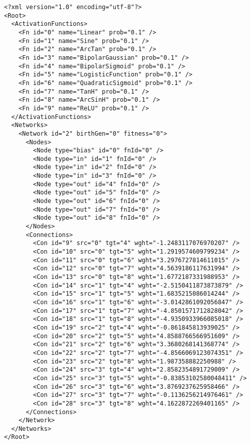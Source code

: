 ﻿\label{sec:appendix}

\begin{lstlisting}[caption={Пример XML файла, представляющего некоторую нейронную сеть},label={lst:xml}]
<?xml version="1.0" encoding="utf-8"?>
<Root>
  <ActivationFunctions>
    <Fn id="0" name="Linear" prob="0.1" />
    <Fn id="1" name="Sine" prob="0.1" />
    <Fn id="2" name="ArcTan" prob="0.1" />
    <Fn id="3" name="BipolarGaussian" prob="0.1" />
    <Fn id="4" name="BipolarSigmoid" prob="0.1" />
    <Fn id="5" name="LogisticFunction" prob="0.1" />
    <Fn id="6" name="QuadraticSigmoid" prob="0.1" />
    <Fn id="7" name="TanH" prob="0.1" />
    <Fn id="8" name="ArcSinH" prob="0.1" />
    <Fn id="9" name="ReLU" prob="0.1" />
  </ActivationFunctions>
  <Networks>
    <Network id="2" birthGen="0" fitness="0">
      <Nodes>
        <Node type="bias" id="0" fnId="0" />
        <Node type="in" id="1" fnId="0" />
        <Node type="in" id="2" fnId="0" />
        <Node type="in" id="3" fnId="0" />
        <Node type="out" id="4" fnId="0" />
        <Node type="out" id="5" fnId="0" />
        <Node type="out" id="6" fnId="0" />
        <Node type="out" id="7" fnId="0" />
        <Node type="out" id="8" fnId="0" />
      </Nodes>
      <Connections>
        <Con id="9" src="0" tgt="4" wght="-1.2483117076970207" />
        <Con id="10" src="0" tgt="5" wght="1.2919574609799234" />
        <Con id="11" src="0" tgt="6" wght="3.2976727814611015" />
        <Con id="12" src="0" tgt="7" wght="4.5639186117631994" />
        <Con id="13" src="0" tgt="8" wght="1.6772187331988953" />
        <Con id="14" src="1" tgt="4" wght="-2.5150411873873879" />
        <Con id="15" src="1" tgt="5" wght="1.6835215086014244" />
        <Con id="16" src="1" tgt="6" wght="-3.0142861092056847" />
        <Con id="17" src="1" tgt="7" wght="-4.8501571712828042" />
        <Con id="18" src="1" tgt="8" wght="-4.9350933966085018" />
        <Con id="19" src="2" tgt="4" wght="-0.861845813939025" />
        <Con id="20" src="2" tgt="5" wght="4.8588766566951609" />
        <Con id="21" src="2" tgt="6" wght="3.3680268141368774" />
        <Con id="22" src="2" tgt="7" wght="-4.8566069123074351" />
        <Con id="23" src="2" tgt="8" wght="1.987358882250988" />
        <Con id="24" src="3" tgt="4" wght="2.8582354891729009" />
        <Con id="25" src="3" tgt="5" wght="-0.83853102580048411" />
        <Con id="26" src="3" tgt="6" wght="3.8769237625958466" />
        <Con id="27" src="3" tgt="7" wght="-0.1136256214976461" />
        <Con id="28" src="3" tgt="8" wght="4.1622872269401165" />
      </Connections>
    </Network>
  </Networks>
</Root>
\end{lstlisting}


